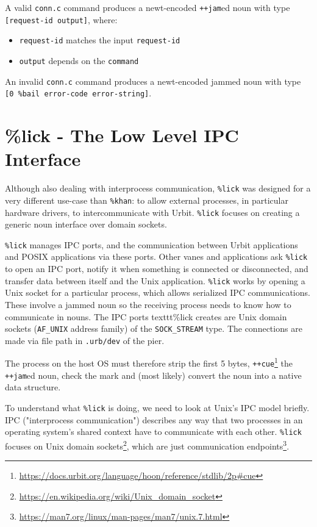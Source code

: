 \documentclass[twoside]{article}
\begin{document}
A valid \texttt{conn.c} command produces a newt-encoded \texttt{++jam}ed noun with type \texttt{[request-id output]}, where:
\begin{itemize}
  \item \texttt{request-id} matches the input \texttt{request-id}
  \item \texttt{output} depends on the \texttt{command}
\end{itemize}

An invalid \texttt{conn.c} command produces a newt-encoded jammed noun with type \texttt{[0 \%bail error-code error-string]}. 

\section{\%lick - The Low Level IPC Interface}

Although also dealing with interprocess communication, \texttt{\%lick} \citep{UIP-101} was designed for a very different use-case than \texttt{\%khan}: to allow external processes, in particular hardware drivers, to intercommunicate with Urbit. 
\texttt{\%lick} focuses on creating a generic noun interface over domain sockets.

\texttt{\%lick} manages IPC ports, and the communication between Urbit applications and POSIX applications via these ports.
Other vanes and applications ask \texttt{\%lick} to open an IPC port, notify it when something is connected or disconnected, and transfer data between itself and the Unix application.
\texttt{\%lick} works by opening a Unix socket for a particular process, which allows serialized IPC communications.  These involve a jammed noun so the receiving process needs to know how to communicate in nouns.
The IPC ports texttt{\%lick} creates are Unix domain sockets (\texttt{AF\_UNIX} address family) of the \texttt{SOCK\_STREAM} type.
The connections are made via file path in \texttt{.urb/dev} of the pier.

The process on the host OS must therefore strip the first 5 bytes, \texttt{++cue}\footnote{\url{https://docs.urbit.org/language/hoon/reference/stdlib/2p#cue}} the \texttt{++jam}ed noun, check the mark and (most likely) convert the noun into a native data structure.

To understand what \texttt{\%lick} is doing, we need to look at Unix's IPC model briefly.
IPC ("interprocess communication") describes any way that two processes in an operating system's shared context have to communicate with each other. 
\texttt{\%lick} focuses on Unix domain sockets\footnote{\url{https://en.wikipedia.org/wiki/Unix_domain_socket}}, which are just communication endpoints\footnote{\url{https://man7.org/linux/man-pages/man7/unix.7.html}}.
\end{document}
